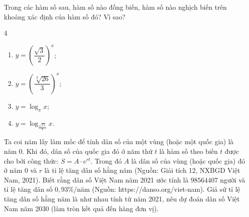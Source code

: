 \begin{bt}%
	Trong các hàm số sau, hàm số nào đồng biến, hàm số nào nghịch biến trên khoảng xác định của hàm số đó? Vì sao?
	\begin{multicols}{4}
		\begin{enumerate}
			\item $y=\left(\dfrac{\sqrt{3}}{2}\right)^x$;
			\item $y=\left(\dfrac{\sqrt[3]{26}}{3}\right)^x$;
			\item $y=\log_\pi x$;
			\item $y=\log_{\tfrac{\sqrt{15}}{4}} x$.
		\end{enumerate}
	\end{multicols}
\end{bt}

\begin{bt}%
	Ta coi năm lấy làm mốc để tính dân số của một vùng (hoặc một quốc gia) là năm 0. Khi đó, dân số của quốc gia đó ở năm thứ $t$ là hàm số theo biến $t$ được cho bởi công thức: $S=A \cdot e^{rt}$. Trong đó $A$ là dân số của vùng (hoặc quốc gia) đó ở năm 0 và $r$ là tỉ lệ tăng dân số hằng năm (Nguồn: Giải tích 12, NXBGD Việt Nam, 2021). Biết rằng dân số Việt Nam năm 2021 ước tính là $98564407$ người và tỉ lệ tăng dân số $0,93\%$/năm (Nguồn: https://danso.org/viet-nam). Giả sử tỉ lệ tăng dân số hằng năm là như nhau tính từ năm 2021, nêu dự đoán dân số Việt Nam năm 2030 (làm tròn kết quả đến hàng đơn vị).
\end{bt}

